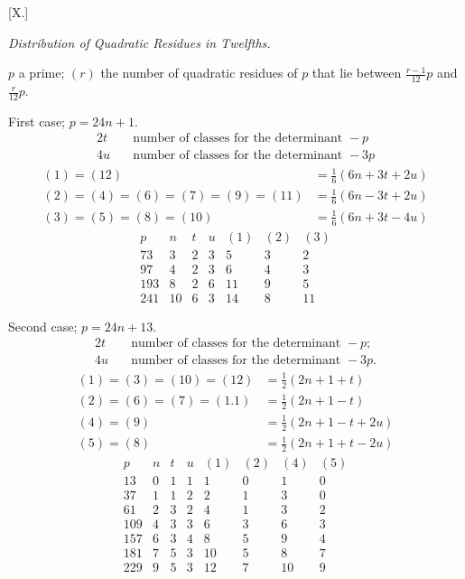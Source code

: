 \clearpage
{}
\par\bigskip{}\centerline{[X.]}\medskip
\begin{center}\emph{Distribution of Quadratic Residues in Twelfths.}\end{center}
$p$ a prime; $(r)$ the number of quadratic residues of $p$ that lie between $\frac{r-1}{12}p$ and $\frac r{12}p$.

First case; $p=24n+1$.
\[
\begin{aligned}
2t&\quad\text{number of classes for the determinant }-p\\
4u&\quad\text{number of classes for the determinant }-3p
\end{aligned}
\]
\[
\begin{aligned}
(1)=(12)&=\tfrac16(6n+3t+2u)\\
(2)=(4)=(6)=(7)=(9)=(11)&=\tfrac16(6n-3t+2u)\\
(3)=(5)=(8)=(10)&=\tfrac16(6n+3t-4u)
\end{aligned}
\]
\[
\begin{array}{r|r|r|r|r|r|r}
p&n&t&u&(1)&(2)&(3)\\\hline
73&3&2&3&5&3&2\\
97&4&2&3&6&4&3\\
193&8&2&6&11&9&5\\
241&10&6&3&14&8&11
\end{array}
\]

Second case; $p=24n+13$.
\[
\begin{aligned}
2t&\quad\text{number of classes for the determinant }-p;\\
4u&\quad\text{number of classes for the determinant }-3p.
\end{aligned}
\]
\[
\begin{aligned}
(1)=(3)=(10)=(12)&=\tfrac12(2n+1+t)\\
(2)=(6)=(7)=(1.1)&=\tfrac12(2n+1-t)\\
(4)=(9)&=\tfrac12(2n+1-t+2u)\\
(5)=(8)&=\tfrac12(2n+1+t-2u)
\end{aligned}
\]
\[
\begin{array}{r|r|r|r|r|r|r|r}
p&n&t&u&(1)&(2)&(4)&(5)\\\hline
13&0&1&1&1&0&1&0\\
37&1&1&2&2&1&3&0\\
61&2&3&2&4&1&3&2\\
109&4&3&3&6&3&6&3\\
157&6&3&4&8&5&9&4\\
181&7&5&3&10&5&8&7\\
229&9&5&3&12&7&10&9
\end{array}
\]

